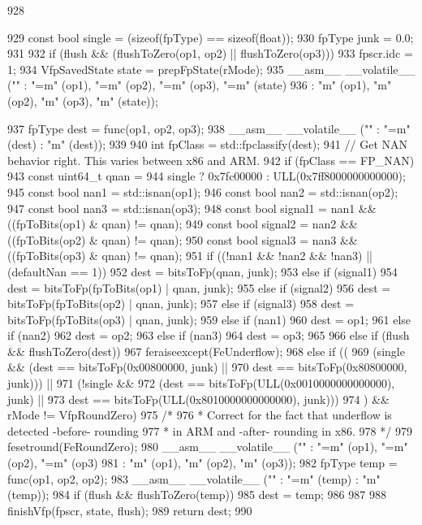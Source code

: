 \begin{DoxyCode}
928 {
929     const bool single = (sizeof(fpType) == sizeof(float));
930     fpType junk = 0.0;
931 
932     if (flush && (flushToZero(op1, op2) || flushToZero(op3)))
933         fpscr.idc = 1;
934     VfpSavedState state = prepFpState(rMode);
935     __asm__ __volatile__ ("" : "=m" (op1), "=m" (op2), "=m" (op3), "=m" (state)
936                              :  "m" (op1),  "m" (op2),  "m" (op3),  "m" (state));
      
937     fpType dest = func(op1, op2, op3);
938     __asm__ __volatile__ ("" : "=m" (dest) : "m" (dest));
939 
940     int fpClass = std::fpclassify(dest);
941     // Get NAN behavior right. This varies between x86 and ARM.
942     if (fpClass == FP_NAN) {
943         const uint64_t qnan =
944             single ? 0x7fc00000 : ULL(0x7ff8000000000000);
945         const bool nan1 = std::isnan(op1);
946         const bool nan2 = std::isnan(op2);
947         const bool nan3 = std::isnan(op3);
948         const bool signal1 = nan1 && ((fpToBits(op1) & qnan) != qnan);
949         const bool signal2 = nan2 && ((fpToBits(op2) & qnan) != qnan);
950         const bool signal3 = nan3 && ((fpToBits(op3) & qnan) != qnan);
951         if ((!nan1 && !nan2 && !nan3) || (defaultNan == 1)) {
952             dest = bitsToFp(qnan, junk);
953         } else if (signal1) {
954             dest = bitsToFp(fpToBits(op1) | qnan, junk);
955         } else if (signal2) {
956             dest = bitsToFp(fpToBits(op2) | qnan, junk);
957         } else if (signal3) {
958             dest = bitsToFp(fpToBits(op3) | qnan, junk);
959         } else if (nan1) {
960             dest = op1;
961         } else if (nan2) {
962             dest = op2;
963         } else if (nan3) {
964             dest = op3;
965         }
966     } else if (flush && flushToZero(dest)) {
967         feraiseexcept(FeUnderflow);
968     } else if ((
969                 (single && (dest == bitsToFp(0x00800000, junk) ||
970                      dest == bitsToFp(0x80800000, junk))) ||
971                 (!single &&
972                     (dest == bitsToFp(ULL(0x0010000000000000), junk) ||
973                      dest == bitsToFp(ULL(0x8010000000000000), junk)))
974                ) && rMode != VfpRoundZero) {
975         /*
976          * Correct for the fact that underflow is detected -before- rounding
977          * in ARM and -after- rounding in x86.
978          */
979         fesetround(FeRoundZero);
980         __asm__ __volatile__ ("" : "=m" (op1), "=m" (op2), "=m" (op3)
981                                  :  "m" (op1),  "m" (op2),  "m" (op3));
982         fpType temp = func(op1, op2, op2);
983         __asm__ __volatile__ ("" : "=m" (temp) : "m" (temp));
984         if (flush && flushToZero(temp)) {
985             dest = temp;
986         }
987     }
988     finishVfp(fpscr, state, flush);
989     return dest;
990 }
\end{DoxyCode}
